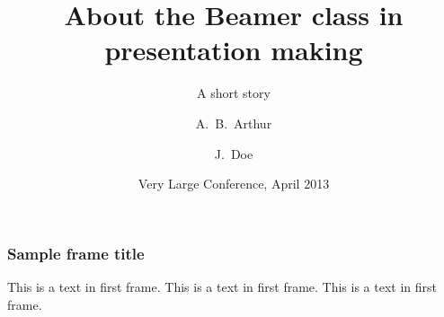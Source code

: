 \documentclass{beamer}
\title[About Beamer] %
{About the Beamer class in presentation making}
\subtitle{A short story}
\author[Arthur, Doe] %
{A.~B.~Arthur\inst{1} \and J.~Doe\inst{2}}
\institute[VFU] %
{
  \inst{1}%
  Faculty of Physics\\
  Very Famous University
  \and
  \inst{2}%
  Faculty of Chemistry\\
  Very Famous University
}
\date[VLC 2013] %
{Very Large Conference, April 2013}
\begin{document}
 
\frame{\titlepage}
 
\begin{frame}
\frametitle{Sample frame title}
This is a text in first frame. This is a text in first frame. This is a text in first frame.
\end{frame}
 
\end{document}
